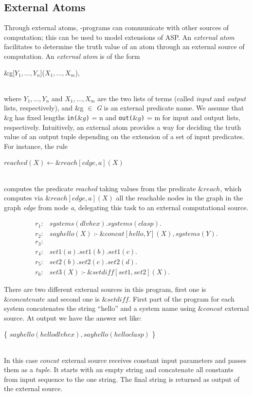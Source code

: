\documentclass[14pt,a4paper, titlepage]{article}
\newcommand{\ext}[3]{\ensuremath{\&{#1}[#2](#3)}}
\DeclareMathOperator{\leftimpl}{:-}
\begin{document}
\subsection{External Atoms}
Through external atoms, \hex{}-programs can communicate with other sources of computation; this can be used to model extensions of ASP.  
An \emph{external atom} facilitates to determine the truth value of an atom through an external source of computation.
An \emph{external atom} is of the form \\ \centerline{ \&g[$Y_1,\dots,Y_n$]($X_1,\dots,X_m$),} \\where $Y_1,\dots,Y_n$ and $X_1,\dots,X_m$ are the two lists of terms (called \textit{input} and \textit{output} lists, respectively), and \&g $\in$ \textit{G} is an external predicate name. We assume that \&g has fixed lengths \texttt{in($\&g$)} = n and \texttt{out($\&g$)} = m for input and output lists, respectively. Intuitively, an external atom provides a way for deciding the truth value of an output tuple depending on the extension of a set of input predicates.
For instance, the rule \\ \centerline{ \textit{$reached(X) \leftarrow \&reach[edge,a](X)$}}
\\computes the predicate \textit{reached} taking values from the predicate $\&reach$, which computes via \textit{$\&reach[edge,a](X)$} all the reachable nodes in the graph in the graph \textit{edge} from node \textit{a}, delegating this task to an external computational source.
\begin{exmp}
\begin{align*}
r_1\colon& \mathit{systems}(\mathit{dlvhex}). \mathit{systems}(\mathit{clasp}). \\  
r_2\colon& \mathit{sayhello(X)} \leftimpl \ext{\mathit{concat}}{\mathit{hello, Y}}{\mathit{X}}, \mathit{systems(Y).}  \\ 
r_3\colon & \\
r_4\colon& \mathit{set1}(a). \mathit{set1}(b). \mathit{set1}(c).\\
r_5\colon& \mathit{set2}(b). \mathit{set2}(c). \mathit{set2}(d).\\
r_6\colon& \mathit{set3}(X) \leftimpl \ext{\mathit{setdiff}}{\mathit{set1, set2}}{\mathit{X}}. 
\end{align*}
\end{exmp}

There are two different external sources in this program, first one is $\mathit{\&concatenate}$ and second one is $\mathit{\&setdiff}$. First part of the program for each system concatenates the string \enquote{hello} and a system name using $\mathit{\&concat}$ external source. At output we have the answer set like:\\ 
\centerline{ \{ $\mathit{sayhello}(\mathit{hellodlvhex}), \mathit{sayhello}(\mathit{helloclasp})$ \}}
\\In this case $\mathit{concat}$ external source receives constant input parameters and passes them as a \emph{tuple}. It starts with an empty string and concatenate all constants from input sequence to the one string. The final string is returned as output of the external source.   
\end{document}
